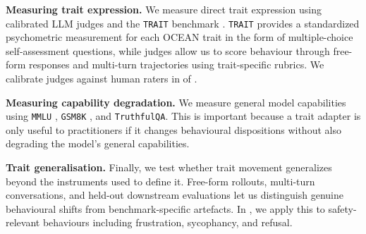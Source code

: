 \textbf{Measuring trait expression.} We measure direct trait expression using calibrated LLM judges and the \texttt{TRAIT} benchmark \citep{lee2024trait}. \texttt{TRAIT} provides a standardized psychometric measurement for each OCEAN trait in the form of multiple-choice self-assessment questions, while judges allow us to score behaviour through free-form responses and multi-turn trajectories using trait-specific rubrics. We calibrate judges against human raters in  of .

\textbf{Measuring capability degradation.} We measure general model capabilities using \texttt{MMLU} \citep{hendryckstest2021}, \texttt{GSM8K} \citep{cobbe2021gsm8k}, and \texttt{TruthfulQA}\citep{lin2022truthfulqa}. This is important because a trait adapter is only useful to practitioners if it changes behavioural dispositions without also degrading the model's general capabilities.

\textbf{Trait generalisation.} Finally, we test whether trait movement generalizes beyond the instruments used to define it. Free-form rollouts, multi-turn conversations, and held-out downstream evaluations let us distinguish genuine behavioural shifts from benchmark-specific artefacts. In , we apply this to safety-relevant behaviours including frustration, sycophancy, and refusal.



